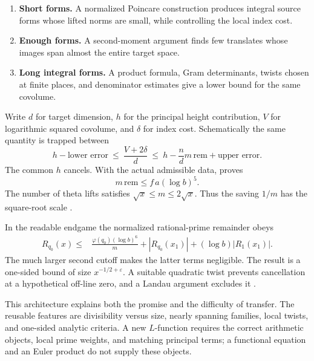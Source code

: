 \begin{enumerate}
\item \textbf{Short forms.} A normalized Poincare construction produces
integral source forms whose lifted norms are small, while controlling the
local index cost.
\item \textbf{Enough forms.} A second-moment argument finds few translates
whose images span almost the entire target space.
\item \textbf{Long integral forms.} A product formula, Gram determinants,
twists chosen at finite places, and denominator estimates give a lower
bound for the same covolume.
\end{enumerate}

Write \(d\) for target dimension, \(h\) for the principal height contribution,
\(V\) for logarithmic squared covolume, and \(\delta\) for index cost.
Schematically the same quantity is trapped between
\[
 h-\text{lower error}
 \ \le\ \frac{V+2\delta}{d}
 \ \le\ h-\frac{n}{d}m\,\mathrm{rem}+\text{upper error}.
\]
The common \(h\) cancels. With the actual admissible data,
 proves
\begin{equation}\label{eq:star}
 m\,\mathrm{rem}\le f\,a(\log b)^5.
\end{equation}
The number of theta lifts satisfies
\(\sqrt{x}\le m\le2\sqrt{x}\). Thus the saving \(1/m\) has the
square-root scale \cite{mainInequality,guide}.

In the readable endgame the normalized rational-prime remainder obeys
\begin{equation}\label{eq:remainder}
\begin{split}
R_{q_0}(x)\le {}&
\frac{\varphi(q_0)(\log b)^6}{m}
{}+|R_{q_0}(x_1)|+(\log b)|R_1(x_1)|.
\end{split}
\end{equation}
The much larger second cutoff makes the latter terms negligible. The
result is a one-sided bound of size \(x^{-1/2+\varepsilon}\).
A suitable quadratic twist prevents cancellation at a hypothetical
off-line zero, and a Landau argument excludes it
\cite{oneSided,suzuki}.

This architecture explains both the promise and the difficulty of transfer.
The reusable features are divisibility versus size, nearly spanning
families, local twists, and one-sided analytic criteria. A new \(L\)-function
requires the correct arithmetic objects, local prime weights, and matching
principal terms; a functional equation and an Euler product do not supply
these objects.

